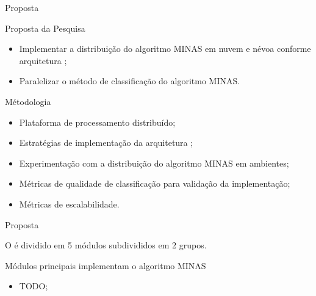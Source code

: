 \documentclass[aspectratio=1610,10pt]{beamer}
\newcommand{\nota}[1]{\hspace*{-0.5cm}\textit{{\color[rgb]{1,0,0}Nota: #1}}}
\begin{document}
\begin{frame}[fragile]{Proposta}
  \begin{block}{Proposta da Pesquisa}
    \begin{itemize}
      
      \item Implementar a distribuição do algoritmo MINAS em nuvem e névoa
      conforme arquitetura \arch;
      
      \item Paralelizar o método de classificação do algoritmo MINAS.
    \end{itemize}
  \end{block}

  \begin{alertblock}{Métodologia}
    \begin{itemize}%
      \item Plataforma de processamento distribuído;
      \item Estratégias de implementação da arquitetura \arch;
      \item Experimentação com a distribuição do algoritmo MINAS em ambientes;
      \item Métricas de qualidade de classificação para validação da implementação;
      \item Métricas de escalabilidade.
    \end{itemize}
  \end{alertblock}
\end{frame}


\begin{frame}[fragile]{Proposta}

  O \mfog é dividido em 5 módulos subdivididos em 2 grupos.
  
  \begin{alertblock}{Módulos principais implementam o algoritmo MINAS}
    \begin{itemize}
      \item TODO;
    \end{itemize}
  \end{alertblock}

\end{frame}
\end{document}
